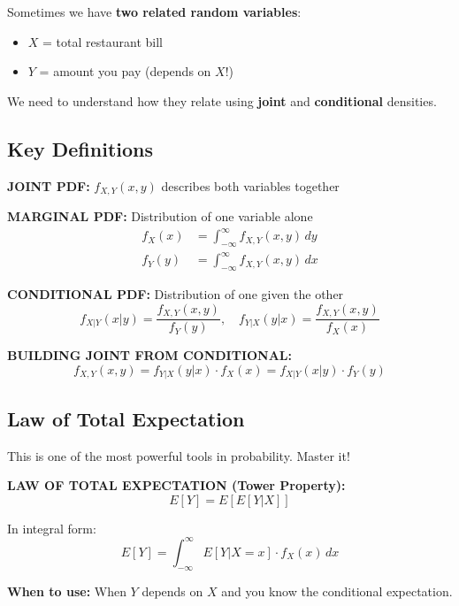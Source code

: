 \documentclass[10pt,letterpaper]{article}
\begin{document}
Sometimes we have \textbf{two related random variables}:
\begin{itemize}
  \item $X$ = total restaurant bill
  \item $Y$ = amount you pay (depends on $X$!)
\end{itemize}

We need to understand how they relate using \textbf{joint} and \textbf{conditional} densities.

\subsection{Key Definitions}

\begin{formulabox}
\textbf{JOINT PDF:} $f_{X,Y}(x,y)$ describes both variables together

\textbf{MARGINAL PDF:} Distribution of one variable alone
\begin{align*}
f_X(x) &= \int_{-\infty}^{\infty} f_{X,Y}(x,y) \, dy \\
f_Y(y) &= \int_{-\infty}^{\infty} f_{X,Y}(x,y) \, dx
\end{align*}

\textbf{CONDITIONAL PDF:} Distribution of one given the other
\[
f_{X|Y}(x|y) = \frac{f_{X,Y}(x,y)}{f_Y(y)}, \quad f_{Y|X}(y|x) = \frac{f_{X,Y}(x,y)}{f_X(x)}
\]

\textbf{BUILDING JOINT FROM CONDITIONAL:}
\[
f_{X,Y}(x,y) = f_{Y|X}(y|x) \cdot f_X(x) = f_{X|Y}(x|y) \cdot f_Y(y)
\]
\end{formulabox}

\subsection{Law of Total Expectation}

\begin{criticalbox}
This is one of the most powerful tools in probability. Master it!
\end{criticalbox}

\begin{formulabox}[colback=yellow!20,colframe=orange!80]
\textbf{LAW OF TOTAL EXPECTATION (Tower Property):}
\[
\boxed{E[Y] = E[E[Y|X]]}
\]

In integral form:
\[
E[Y] = \int_{-\infty}^{\infty} E[Y|X=x] \cdot f_X(x) \, dx
\]

\textbf{When to use:} When $Y$ depends on $X$ and you know the conditional expectation.
\end{formulabox}
\end{document}
